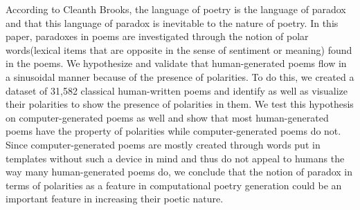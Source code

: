 According to Cleanth Brooks, the language of poetry is the language of paradox and that this language of paradox is inevitable to the nature of poetry. In this paper, paradoxes in poems are investigated through the notion of polar words(lexical items that are opposite in the sense of sentiment or meaning) found in the poems. We hypothesize and validate that human-generated poems flow in a sinusoidal manner because of the presence of polarities. To do this, we created a dataset of 31,582 classical human-written poems and identify as well as visualize their polarities to show the presence of polarities in them. We test this hypothesis on computer-generated poems as well and show that most human-generated poems have the property of polarities while computer-generated poems do not. Since computer-generated poems are mostly created through words put in templates without such a device in mind and thus do not appeal to humans the way many human-generated poems do, we conclude that the notion of paradox in terms of polarities as a feature in computational poetry generation could be an important feature in increasing their poetic nature.
